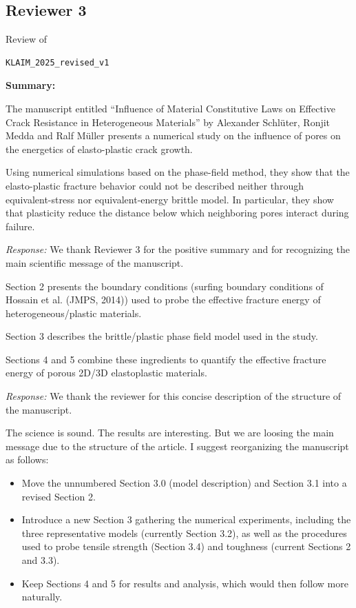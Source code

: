 \documentclass[pdflatex,sn-mathphys-num]{sn-jnl}
\begin{document}

\subsection*{Reviewer 3}

Review of
\begin{verbatim}
KLAIM_2025_revised_v1
\end{verbatim}

\bigskip

\textbf{Summary:}

The manuscript entitled “Influence of Material Constitutive Laws on Effective Crack Resistance in Heterogeneous Materials” by Alexander Schlüter, Ronjit Medda and Ralf Müller presents a numerical study on the influence of pores on the energetics of elasto-plastic crack growth.

Using numerical simulations based on the phase-field method, they show that the elasto-plastic fracture behavior could not be described neither through equivalent-stress nor equivalent-energy brittle model. In particular, they show that plasticity reduce the distance below which neighboring pores interact during failure.

\emph{Response:} We thank Reviewer 3 for the positive summary and for recognizing the main scientific message of the manuscript.

\bigskip

Section 2 presents the boundary conditions (surfing boundary conditions of Hossain et al. (JMPS, 2014)) used to probe the effective fracture energy of heterogeneous/plastic materials.

Section 3 describes the brittle/plastic phase field model used in the study.

Sections 4 and 5 combine these ingredients to quantify the effective fracture energy of porous 2D/3D elastoplastic materials.

\emph{Response:} We thank the reviewer for this concise description of the structure of the manuscript.

\bigskip

The science is sound. The results are interesting. But we are loosing the main message due to the structure of the article. I suggest reorganizing the manuscript as follows:

\begin{itemize}
\item Move the unnumbered Section 3.0 (model description) and Section 3.1 into a revised Section 2.
\item Introduce a new Section 3 gathering the numerical experiments, including the three representative models (currently Section 3.2), as well as the procedures used to probe tensile strength (Section 3.4) and toughness (current Sections 2 and 3.3).
\item Keep Sections 4 and 5 for results and analysis, which would then follow more naturally.
\end{itemize}
\end{document}
